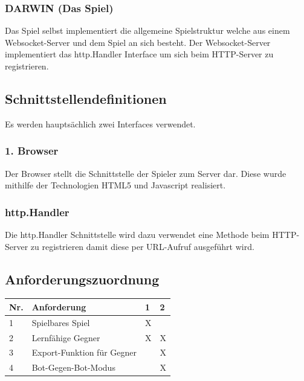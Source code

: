 \subsubsection{DARWIN (Das Spiel)}
Das Spiel selbst implementiert die allgemeine Spielstruktur welche aus einem Websocket-Server und dem Spiel an sich besteht. Der Websocket-Server implementiert das http.Handler Interface um sich beim HTTP-Server zu registrieren.
\subsection{Schnittstellendefinitionen}
Es werden hauptsächlich zwei Interfaces verwendet.
\subsubsection{1. Browser}
Der Browser stellt die Schnittstelle der Spieler zum Server dar. Diese wurde
mithilfe der Technologien HTML5 und Javascript realisiert.
\subsubsection{http.Handler}
Die http.Handler Schnittstelle wird dazu verwendet eine Methode beim HTTP-Server zu registrieren damit diese per URL-Aufruf ausgeführt wird.
\subsection{Anforderungszuordnung}
\begin{tabularx}{\textwidth}{|p{0.7cm}|p{7.0cm}|X|X|}
\hline
Nr. & Anforderung & 1 & 2 \\
\hline
1 & Spielbares Spiel & X & \\
\hline
2 & Lernfähige Gegner & X & X  \\
\hline
3 & Export-Funktion für Gegner & & X  \\
\hline
4 & Bot-Gegen-Bot-Modus & & X    \\
\hline
\end{tabularx}
\newpage

